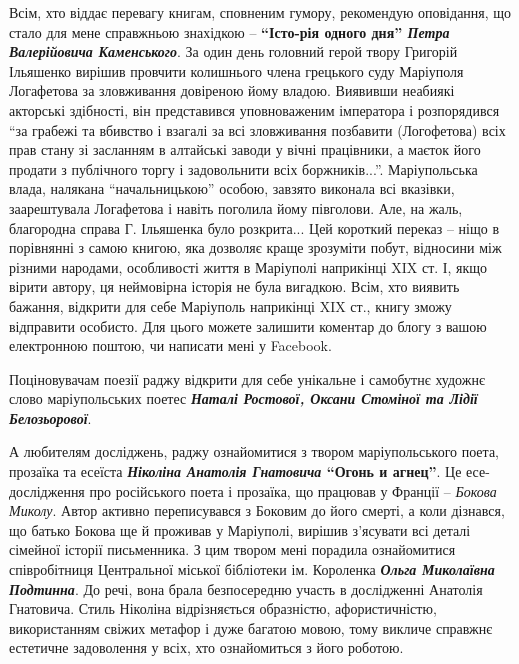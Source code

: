 Всім, хто віддає перевагу книгам, сповненим гумору, рекомендую оповідання, що
стало для мене справжньою знахідкою – \textbf{\enquote{Істо\hyp{}рія одного дня} \emph{Петра Валерійовича
Каменського}}. За один день головний герой твору Григорій Ільяшенко вирішив
провчити колишнього члена грецького суду Маріуполя Логафетова за зловживання
довіреною йому владою. Виявивши неабиякі акторські здібності, він представився
уповноваженим імператора і розпорядився \enquote{за грабежі та вбивство і взагалі за
всі зловживання позбавити (Логофетова) всіх прав стану зі засланням в алтайські
заводи у вічні працівники, а маєток його продати з публічного торгу і
задовольнити всіх боржників...}. Маріупольська влада, налякана \enquote{начальницькою}
особою, завзято виконала всі вказівки, заарештувала Логафетова і навіть
поголила йому півголови. Але, на жаль, благородна справа Г. Ільяшенка було
розкрита... Цей короткий переказ – ніщо в порівнянні з самою книгою, яка дозволяє
краще зрозуміти побут, відносини між різними народами, особливості життя в
Маріуполі наприкінці XIX ст. І, якщо вірити автору, ця неймовірна історія не
була вигадкою. Всім, хто виявить бажання, відкрити для себе Маріуполь
наприкінці XIX ст., книгу зможу відправити особисто. Для цього можете залишити
коментар до блогу з вашою електронною поштою, чи написати мені у Facebook.

Поціновувачам поезії раджу відкрити для себе унікальне і самобутнє художнє
слово маріупольських поетес \textbf{\emph{Наталі Ростової, Оксани Стоміної та Лідії
Белозьорової}}.


А любителям досліджень, раджу ознайомитися з твором маріупольського поета,
прозаїка та есеїста \textbf{\emph{Ніколіна Анатолія Гнатовича} \enquote{Огонь и агнец}}. Це
есе-дослідження про російського поета і прозаїка, що працював у Франції –
\emph{Бокова Миколу}. Автор активно переписувався з Боковим до його смерті, а коли
дізнався, що батько Бокова ще й проживав у Маріуполі, вирішив з'ясувати всі
деталі сімейної історії письменника. З цим твором мені порадила ознайомитися
співробітниця Центральної міської бібліотеки ім. Короленка \emph{\textbf{Ольга Миколаївна
Подтинна}}. До речі, вона брала безпосередню участь в дослідженні Анатолія
Гнатовича. Стиль Ніколіна відрізняється образністю, афористичністю,
використанням свіжих метафор і дуже багатою мовою, тому викличе справжнє
естетичне задоволення у всіх, хто ознайомиться з його роботою.


